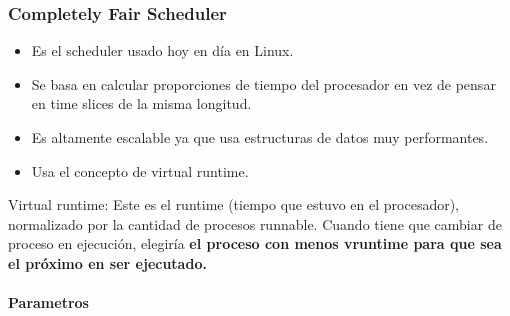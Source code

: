 \documentclass{article}
\begin{document}
\subsubsection{Completely Fair
Scheduler}\label{completely-fair-scheduler}

\begin{itemize}
\item
  Es el scheduler usado hoy en día en Linux.
\item
  Se basa en calcular proporciones de tiempo del procesador en vez de
  pensar en time slices de la misma longitud.
\item
  Es altamente escalable ya que usa estructuras de datos muy
  performantes.
\item
  Usa el concepto de virtual runtime.
\end{itemize}

Virtual runtime: Este es el runtime (tiempo que estuvo en el
procesador), normalizado por la cantidad de procesos runnable. Cuando
tiene que cambiar de proceso en ejecución, elegiría \textbf{el proceso
con menos vruntime para que sea el próximo en ser ejecutado.}

\paragraph{Parametros}\label{parametros}
\end{document}
